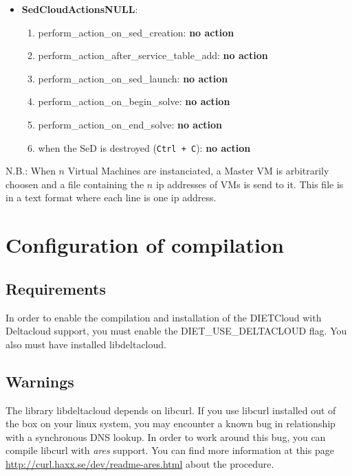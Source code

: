 \begin{itemize}
  \item \textbf{SedCloudActionsNULL}:
    \begin{enumerate}
        \item perform\_action\_on\_sed\_creation: \textbf{no action}
        \item perform\_action\_after\_service\_table\_add: \textbf{no action}
        \item perform\_action\_on\_sed\_launch: \textbf{no action}
        \item perform\_action\_on\_begin\_solve: \textbf{no action}
        \item perform\_action\_on\_end\_solve: \textbf{no action}
        \item when the SeD is destroyed (\texttt{Ctrl + C}): \textbf{no action}
   \end{enumerate}
\end{itemize}

N.B.: When $n$ Virtual Machines are instanciated, a Master VM is
arbitrarily choosen and a file containing the $n$ ip addresses of VMs
is send to it. This file is in a text format where each line is one ip
address.



\section{Configuration of compilation}

\subsection{Requirements}

In order to enable the compilation and installation of the DIETCloud
with Deltacloud support, you must enable the DIET\_USE\_DELTACLOUD
flag. You also must have installed libdeltacloud.

\subsection{Warnings}

The library libdeltacloud depends on libcurl. If you use libcurl
installed out of the box on your linux system, you may encounter a known bug
in relationship with a synchronous DNS lookup. In order to work around
this bug, you can compile libcurl with \emph{ares} support. You can find more
information at this page
\url{http://curl.haxx.se/dev/readme-ares.html} about the procedure.

